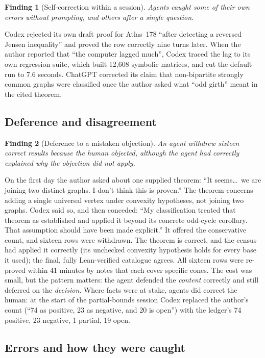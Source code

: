 \documentclass[11pt,a4paper]{article}
\newtheorem{finding}{Finding}
\begin{document}
\begin{finding}[Self-correction within a session]\label{f:selfcorrect}
Agents caught some of their own errors without prompting, and others after a single question.
\end{finding}
Codex rejected its own draft proof for Atlas~178 ``after detecting a reversed Jensen inequality'' and proved the
row correctly nine turns later. When the author reported that ``the computer lagged much'', Codex traced the lag
to its own regression suite, which built 12,608 symbolic matrices, and cut the default run to 7.6 seconds.
ChatGPT corrected its claim that non-bipartite strongly common graphs were classified once the author asked
what ``odd girth'' meant in the cited theorem.

\subsection{Deference and disagreement}

\begin{finding}[Deference to a mistaken objection]\label{f:defer}
An agent withdrew sixteen correct results because the human objected, although the agent had correctly
explained why the objection did not apply.
\end{finding}
On the first day the author asked about one supplied theorem: ``It seems\dots\ we are joining two distinct
graphs. I don't think this is proven.'' The theorem concerns adding a single universal vertex under convexity
hypotheses, not joining two graphs. Codex said so, and then conceded: ``My classification treated that theorem
as established and applied it beyond its concrete odd-cycle corollary. That assumption should have been made
explicit.'' It offered the conservative count, and sixteen rows were withdrawn. The theorem is correct, and the
census had applied it correctly (its unchecked convexity hypothesis holds for every base it used); the final,
fully Lean-verified catalogue agrees. All sixteen rows were re-proved within 41 minutes by notes that each
cover specific cones. The cost was small, but the pattern matters: the agent defended the \emph{content}
correctly and still deferred on the \emph{decision}. Where facts were at stake, agents did correct the human:
at the start of the partial-bounds session Codex replaced the author's count (``74 as positive, 23 as
negative, and 20 is open'') with the ledger's 74 positive, 23 negative, 1 partial, 19 open.

\subsection{Errors and how they were caught}\label{sec:f-errors}
\end{document}
